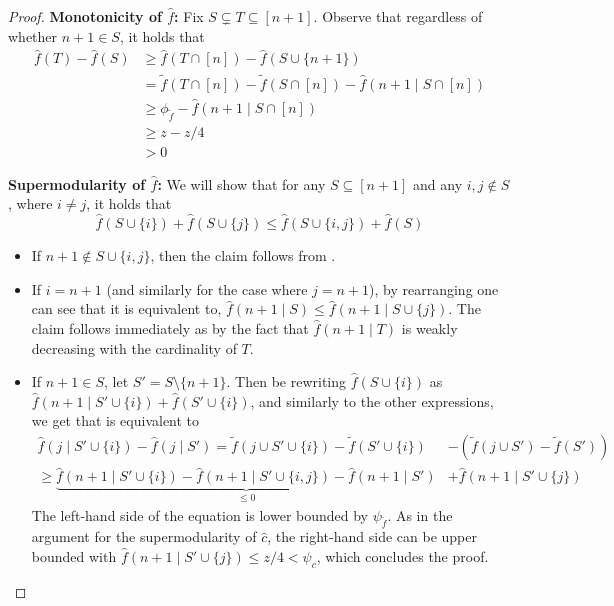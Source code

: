 \documentclass[11pt]{article}
\newcommand{\tf}{\tilde{f}}
\newcommand{\hf}{\hat{f}}
\newcommand{\hc}{\hat{c}}
\begin{document}
\begin{proof}
    \textbf{Monotonicity of $\hf$:} 
    Fix $S \subsetneq T \subseteq [n+1]$. Observe that regardless of whether $n+1 \in S$, it holds that
    \begin{align*}
            \hf(T) - \hf(S) 
            &\ge \hf(T \cap [n]) - \hf(S \cup \{n+1\}) \\
            &= \tf(T\cap [n]) - \tf(S\cap [n]) - \hf(n+1\mid S\cap[n]) \\
            &\ge \phi_{\tf} - \hf(n+1\mid S\cap[n]) \\ 
            &\ge z - z/4 \\
            &> 0
    \end{align*}
    
    \textbf{Supermodularity of $\hf$:}
    We will show that for any $S \subseteq [n+1]$ and any $i,j \notin S$, where $i \ne j$, it holds that 
    \begin{equation}\label{eq:fSupMod}
        \hf(S \cup \{i\}) + \hf(S \cup \{j\}) \le \hf(S \cup \{i,j\}) + \hf(S)  
    \end{equation}
    
    \begin{itemize}
    \setlength\itemsep{-0.25em}
    \item If $n+1 \notin S \cup \{i,j\}$, then the claim follows from .
    \item If $i=n+1$ (and similarly for the case where $j=n+1$), by rearranging  one can see that it is equivalent to,
    $\hf(n+1 \mid S) \le \hf(n+1 \mid S \cup \{j\})$. The claim follows immediately as by the fact that $\hf(n+1 \mid T)$ is weakly decreasing with the cardinality of $T$.
    \item If $n+1 \in S$, let $S' = S \setminus \{n+1\}$. 
    Then be rewriting $\hf(S \cup \{i\})$ as $\hf(n+1 \mid S' \cup \{i\}) + \hf(S'\cup\{i\})$, and similarly to the other expressions, we get that 
     is equivalent to
    \begin{align*}
    \hf(j \mid S' \cup \{i\}) - \hf(j \mid S')
    = \tf(j \cup S' \cup \{i\}) - \tf(S' \cup \{i\}) &- (\tf(j \cup S') - \tf(S')) \\
    \ge 
    \underbrace{\hf(n+1 \mid S' \cup \{i\}) - \hf(n+1 \mid S'\cup\{i,j\})   - \hf(n+1 \mid S')}_{\le 0} &+ \hf(n+1 \mid S' \cup \{j\})
    \end{align*}
    The left-hand side of the equation is lower bounded by $\psi_{\tf}$. 
    As in the argument for the supermodularity of $\hc$, the right-hand side can be upper bounded with $\hf(n+1 \mid S' \cup \{j\}) \le z/4 < \psi_{c}$, which concludes the proof. \qedhere
    \end{itemize}
\end{proof}
\end{document}

